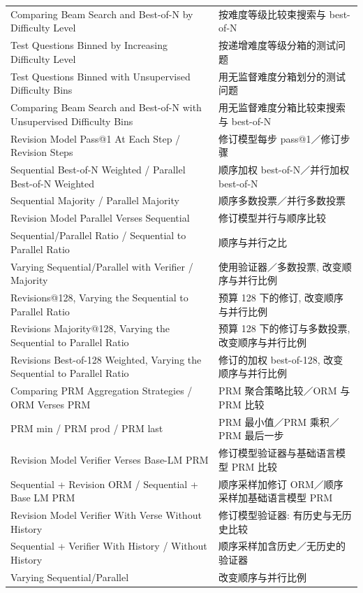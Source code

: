 \begin{longtable}{p{.47\linewidth}p{.47\linewidth}}
Comparing Beam Search and Best-of-N by Difficulty Level & 按难度等级比较束搜索与 best-of-N\\
Test Questions Binned by Increasing Difficulty Level & 按递增难度等级分箱的测试问题\\
Test Questions Binned with Unsupervised Difficulty Bins & 用无监督难度分箱划分的测试问题\\
Comparing Beam Search and Best-of-N with Unsupervised Difficulty Bins & 用无监督难度分箱比较束搜索与 best-of-N\\
Revision Model Pass@1 At Each Step / Revision Steps & 修订模型每步 pass@1／修订步骤\\
Sequential Best-of-N Weighted / Parallel Best-of-N Weighted & 顺序加权 best-of-N／并行加权 best-of-N\\
Sequential Majority / Parallel Majority & 顺序多数投票／并行多数投票\\
Revision Model Parallel Verses Sequential & 修订模型并行与顺序比较\\
Sequential/Parallel Ratio / Sequential to Parallel Ratio & 顺序与并行之比\\
Varying Sequential/Parallel with Verifier / Majority & 使用验证器／多数投票, 改变顺序与并行比例\\
Revisions@128, Varying the Sequential to Parallel Ratio & 预算 128 下的修订, 改变顺序与并行比例\\
Revisions Majority@128, Varying the Sequential to Parallel Ratio & 预算 128 下的修订与多数投票, 改变顺序与并行比例\\
Revisions Best-of-128 Weighted, Varying the Sequential to Parallel Ratio & 修订的加权 best-of-128, 改变顺序与并行比例\\
Comparing PRM Aggregation Strategies / ORM Verses PRM & PRM 聚合策略比较／ORM 与 PRM 比较\\
PRM min / PRM prod / PRM last & PRM 最小值／PRM 乘积／PRM 最后一步\\
Revision Model Verifier Verses Base-LM PRM & 修订模型验证器与基础语言模型 PRM 比较\\
Sequential + Revision ORM / Sequential + Base LM PRM & 顺序采样加修订 ORM／顺序采样加基础语言模型 PRM\\
Revision Model Verifier With Verse Without History & 修订模型验证器: 有历史与无历史比较\\
Sequential + Verifier With History / Without History & 顺序采样加含历史／无历史的验证器\\
Varying Sequential/Parallel & 改变顺序与并行比例\\
\bottomrule
\end{longtable}

